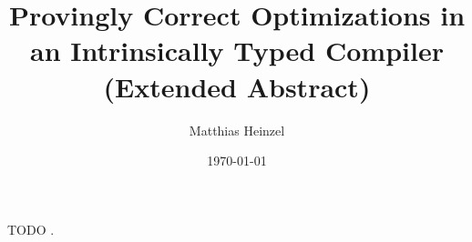 \documentclass[sigplan,screen,authordraft]{acmart}
\title{Provingly Correct Optimizations in an Intrinsically Typed Compiler (Extended Abstract)}
\author{Matthias Heinzel}
\affiliation{%
  \institution{Utrecht University}
  \city{Utrecht}
  \country{Netherlands}}
\date{\today}
\begin{document}
\maketitle

TODO \cite{chapman2009type}.


{}
\end{document}
